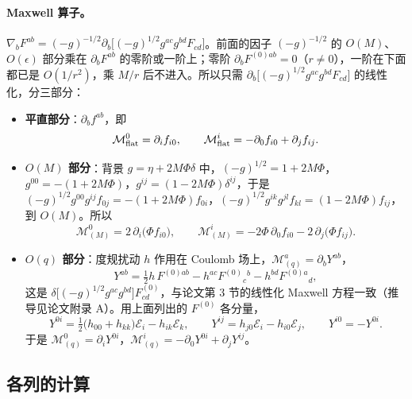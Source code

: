 \documentclass[11pt,a4paper]{ctexart}
\numberwithin{equation}{section}
\begin{document}
\paragraph{Maxwell 算子。}$\nabla_bF^{ab}=(-g)^{-1/2}\partial_b\big[(-g)^{1/2}g^{ac}g^{bd}F_{cd}\big]$。前面的因子 $(-g)^{-1/2}$ 的 $O(M)$、$O(\epsilon)$ 部分乘在 $\partial_b F^{ab}$ 的零阶或一阶上；零阶 $\partial_bF^{(0)ab}=0$（$r\neq0$），一阶在下面都已是 $O(1/r^2)$，乘 $M/r$ 后不进入。所以只需 $\partial_b\big[(-g)^{1/2}g^{ac}g^{bd}F_{cd}\big]$ 的线性化，分三部分：
\begin{itemize}
\item \textbf{平直部分}：$\partial_bf^{ab}$，即
\begin{equation}
\mathcal M^0_{\rm flat}=\partial_if_{i0},\qquad \mathcal M^i_{\rm flat}=-\partial_0f_{i0}+\partial_jf_{ij}.
\label{eq:Mflat}
\end{equation}
\item \textbf{$O(M)$ 部分}：背景 $g=\eta+2M\Phi\delta$ 中，$(-g)^{1/2}=1+2M\Phi$，$g^{00}=-(1+2M\Phi)$，$g^{ij}=(1-2M\Phi)\delta^{ij}$，于是 $(-g)^{1/2}g^{00}g^{ij}f_{0j}=-(1+2M\Phi)f_{0i}$，$(-g)^{1/2}g^{ik}g^{jl}f_{kl}=(1-2M\Phi)f_{ij}$，到 $O(M)$。所以
\begin{equation}
\mathcal M^0_{(M)}=2\,\partial_i\big(\Phi f_{i0}\big),\qquad \mathcal M^i_{(M)}=-2\Phi\,\partial_0f_{i0}-2\,\partial_j\big(\Phi f_{ij}\big).
\label{eq:MM}
\end{equation}
\item \textbf{$O(q)$ 部分}：度规扰动 $h$ 作用在 Coulomb 场上，$\mathcal M^a_{(q)}=\partial_bY^{ab}$，
\begin{equation}
Y^{ab}=\tfrac12h\,F^{(0)ab}-h^{ac}F^{(0)}{}_c{}^b-h^{bd}F^{(0)a}{}_d ,
\label{eq:Y}
\end{equation}
这是 $\delta\big[(-g)^{1/2}g^{ac}g^{bd}\big]F^{(0)}_{cd}$，与论文第 3 节的线性化 Maxwell 方程一致（推导见论文附录 A）。用上面列出的 $F^{(0)}$ 各分量，
\begin{equation}
Y^{0i}=\tfrac12\big(h_{00}+h_{kk}\big)\mathcal E_i-h_{ik}\mathcal E_k,\qquad
Y^{ij}=h_{j0}\mathcal E_i-h_{i0}\mathcal E_j,\qquad Y^{i0}=-Y^{0i}.
\label{eq:Ycomp}
\end{equation}
于是 $\mathcal M^0_{(q)}=\partial_iY^{0i}$，$\mathcal M^i_{(q)}=-\partial_0Y^{0i}+\partial_jY^{ij}$。
\end{itemize}

\subsection{各列的计算}
\end{document}

